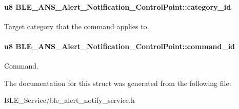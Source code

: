 \paragraph[{\texorpdfstring{category\+\_\+id}{category_id}}]{\setlength{\rightskip}{0pt plus 5cm}u8 B\+L\+E\+\_\+\+A\+N\+S\+\_\+\+Alert\+\_\+\+Notification\+\_\+\+Control\+Point\+::category\+\_\+id}\hypertarget{struct_b_l_e___a_n_s___alert___notification___control_point_ab0413aee1f9150d1ee542a5a1ae73517}{}\label{struct_b_l_e___a_n_s___alert___notification___control_point_ab0413aee1f9150d1ee542a5a1ae73517}
Target category that the command applies to. 
\paragraph[{\texorpdfstring{command\+\_\+id}{command_id}}]{\setlength{\rightskip}{0pt plus 5cm}u8 B\+L\+E\+\_\+\+A\+N\+S\+\_\+\+Alert\+\_\+\+Notification\+\_\+\+Control\+Point\+::command\+\_\+id}\hypertarget{struct_b_l_e___a_n_s___alert___notification___control_point_a1cc88b9e0767f9a2ad4ba67108986fe4}{}\label{struct_b_l_e___a_n_s___alert___notification___control_point_a1cc88b9e0767f9a2ad4ba67108986fe4}
Command. 

The documentation for this struct was generated from the following file\+:\begin{DoxyCompactItemize}
\item 
B\+L\+E\+\_\+\+Service/ble\+\_\+alert\+\_\+notify\+\_\+service.\+h\end{DoxyCompactItemize}
